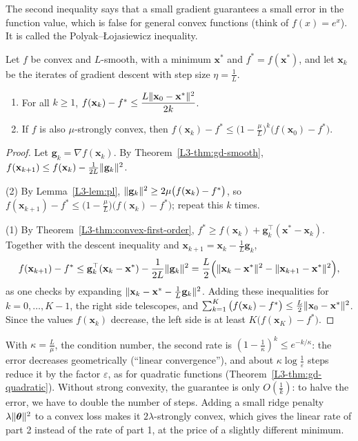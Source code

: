 The second inequality says that a small gradient guarantees a small error in the function value, which is false for general convex functions (think of $f(x) = e^x$). It is called the Polyak--{\L}ojasiewicz inequality.

\begin{theorem}\label{L3-thm:gd-rates}
    Let $f$ be convex and $L$-smooth, with a minimum $\mathbf{x}^*$ and $f^* = f(\mathbf{x}^*)$, and let $\mathbf{x}_k$ be the iterates of gradient descent with step size $\eta = \frac{1}{L}$.
    \begin{enumerate}
        \item For all $k \geq 1$, $f(\mathbf{x}_k) - f^* \leq \dfrac{L\lVert \mathbf{x}_0 - \mathbf{x}^* \rVert^2}{2k}$.
        \item If $f$ is also $\mu$-strongly convex, then $f(\mathbf{x}_k) - f^* \leq \big(1 - \frac{\mu}{L}\big)^k\big(f(\mathbf{x}_0) - f^*\big)$.
    \end{enumerate}
\end{theorem}

\begin{proof}
    Let $\mathbf{g}_k = \nabla f(\mathbf{x}_k)$. By Theorem~\ref{L3-thm:gd-smooth}, $f(\mathbf{x}_{k+1}) \leq f(\mathbf{x}_k) - \frac{1}{2L}\lVert \mathbf{g}_k \rVert^2$.

    (2) By Lemma~\ref{L3-lem:pl}, $\lVert \mathbf{g}_k \rVert^2 \geq 2\mu\big(f(\mathbf{x}_k) - f^*\big)$, so $f(\mathbf{x}_{k+1}) - f^* \leq \big(1 - \frac{\mu}{L}\big)\big(f(\mathbf{x}_k) - f^*\big)$; repeat this $k$ times.

    (1) By Theorem~\ref{L3-thm:convex-first-order}, $f^* \geq f(\mathbf{x}_k) + \mathbf{g}_k^\top(\mathbf{x}^* - \mathbf{x}_k)$. Together with the descent inequality and $\mathbf{x}_{k+1} = \mathbf{x}_k - \frac{1}{L}\mathbf{g}_k$,
    \[f(\mathbf{x}_{k+1}) - f^* \leq \mathbf{g}_k^\top(\mathbf{x}_k - \mathbf{x}^*) - \frac{1}{2L}\lVert \mathbf{g}_k \rVert^2 = \frac{L}{2}\Big(\lVert \mathbf{x}_k - \mathbf{x}^* \rVert^2 - \lVert \mathbf{x}_{k+1} - \mathbf{x}^* \rVert^2\Big),\]
    as one checks by expanding $\lVert \mathbf{x}_k - \mathbf{x}^* - \frac{1}{L}\mathbf{g}_k \rVert^2$. Adding these inequalities for $k = 0, \ldots, K - 1$, the right side telescopes, and $\sum_{k=1}^K \big(f(\mathbf{x}_k) - f^*\big) \leq \frac{L}{2}\lVert \mathbf{x}_0 - \mathbf{x}^* \rVert^2$. Since the values $f(\mathbf{x}_k)$ decrease, the left side is at least $K\big(f(\mathbf{x}_K) - f^*\big)$.
\end{proof}

With $\kappa = \frac{L}{\mu}$, the condition number, the second rate is $(1 - \frac{1}{\kappa})^k \leq e^{-k/\kappa}$: the error decreases geometrically (``linear convergence''), and about $\kappa\log\frac{1}{\varepsilon}$ steps reduce it by the factor $\varepsilon$, as for quadratic functions (Theorem~\ref{L3-thm:gd-quadratic}). Without strong convexity, the guarantee is only $O(\frac{1}{k})$: to halve the error, we have to double the number of steps. Adding a small ridge penalty $\lambda\lVert \boldsymbol{\theta} \rVert^2$ to a convex loss makes it $2\lambda$-strongly convex, which gives the linear rate of part 2 instead of the rate of part 1, at the price of a slightly different minimum.

